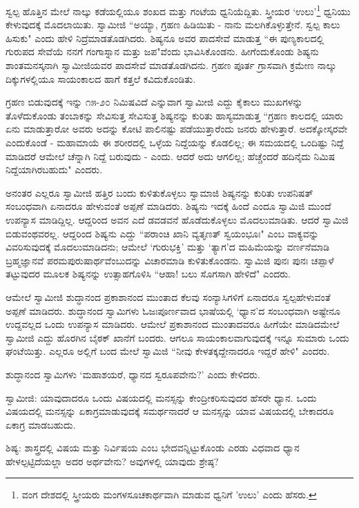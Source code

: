 ಸ್ವಲ್ಪ ಹೊತ್ತಿನ ಮೇಲೆ ನಾಲ್ಕು ಕಡೆಯಲ್ಲಿಯೂ ಶಂಖದ ಮತ್ತು ಗಂಟೆಯ ಧ್ವನಿಯೆದ್ದಿತು. ಸ್ತ್ರೀಯರ ‘ಉಲು’\footnote{ವಂಗ ದೇಶದಲ್ಲಿ ಸ್ತ್ರೀಯರು ಮಂಗಳಸೂಚಕಾರ್ಥವಾಗಿ ಮಾಡುವ ಧ್ವನಿಗೆ 'ಉಲು' ಎಂದು ಹೆಸರು.} ಧ್ವನಿಯು ಕೇಳುವುದಕ್ಕೆ ಮೊದಲಾಯಿತು. ಸ್ವಾಮೀಜಿ “ಅಯ್ಯಾ, ಗ್ರಹಣ ಹಿಡಿಯಿತು - ನಾನು ಮಲಗಿಕೊಳ್ಳುತ್ತೇನೆ. ಸ್ವಲ್ಪ ಕಾಲು ಹಿಸುಕು" ಎಂದು ಹೇಳಿ ನಿದ್ರೆಮಾಡತೊಡಗಿದರು. ಶಿಷ್ಯನೂ ಅವರ ಪಾದಸೇವೆ ಮಾಡುತ್ತ “ಈ ಪುಣ್ಯಕಾಲದಲ್ಲಿ ಗುರುಪದ ಸೇವೆಯೆ ನನಗೆ ಗಂಗಾಸ್ನಾನ ಮತ್ತು ಜಪ"ವೆಂದು ಭಾವಿಸಿಕೊಂಡನು. ಹೀಗೆಂದುಕೊಂಡು ಶಿಷ್ಯನು ಶಾಂತಮನಸ್ಕನಾಗಿ ಸ್ವಾಮೀಜಿಯವರ ಪಾದಸೇವೆ ಮಾಡತೊಡಗಿದನು. ಗ್ರಹಣ ಪೂರ್ತ ಗ್ರಾಸವಾಗಿ ಕ್ರಮೇಣ ನಾಲ್ಕು ದಿಕ್ಕುಗಳಲ್ಲಿಯೂ ಸಾಯಂಕಾಲದ ಹಾಗೆ ಕತ್ತಲೆ ಕವಿದುಕೊಂಡಿತು.

ಗ್ರಹಣ ಬಿಡುವುದಕ್ಕೆ ಇನ್ನು ೧೫-೨೦ ನಿಮಿಷವಿದೆ ಎನ್ನುವಾಗ ಸ್ವಾಮೀಜಿ ಎದ್ದು ಕೈಕಾಲು ಮುಖಗಳನ್ನು ತೊಳೆದುಕೊಂಡು ತಂಬಾಕನ್ನು ಸೇವಿಸುತ್ತ ಸೇವಿಸುತ್ತ ಶಿಷ್ಯನನ್ನು ಕುರಿತು ಹಾಸ್ಯಮಾಡುತ್ತ “ಗ್ರಹಣ ಕಾಲದಲ್ಲಿ ಯಾರು ಏನು ಮಾಡುತ್ತಾರೋ ಅವರು ಅದನ್ನು ಕೋಟಿ ಪಾಲಿನಷ್ಟು ಪಡೆಯುತ್ತಾರೆಂದು ಜನರು ಹೇಳುತ್ತಾರೆ. ಅದಕ್ಕೋಸ್ಕರವೇ ಎಂದುಕೊಂಡೆ - ಮಹಾಮಾಯೆ ಈ ಶರೀರದಲ್ಲಿ ಒಳ್ಳೆಯ ನಿದ್ದೆಯನ್ನು ಕೊಡಲಿಲ್ಲ; ಈ ಸಮಯದಲ್ಲಿ ಒಂದಿಷ್ಟು ನಿದ್ದೆ ಮಾಡಿದರೆ ಆಮೇಲೆ ಚೆನ್ನಾಗಿ ನಿದ್ದೆ ಬರುವುದು - ಎಂದು. ಆದರೆ ಅದು ಆಗಲಿಲ್ಲ; ಹೆಚ್ಚೆಂದರೆ ಹದಿನೈದು ನಿಮಿಷ ನಿದ್ದೆಯಾಗಿರಬಹುದು" ಎಂದರು.

ಅನಂತರ ಎಲ್ಲರೂ ಸ್ವಾಮೀಜಿ ಹತ್ತಿರ ಬಂದು ಕುಳಿತುಕೊಳ್ಳಲು ಸ್ವಾಮಾಜಿ ಶಿಷ್ಯನನ್ನು ಕುರಿತು ಉಪನಿಷತ್‌ ಸಂಬಂಧವಾಗಿ ಏನಾದರೂ ಹೇಳುವಂತೆ ಅಪ್ಪಣೆ ಮಾಡಿದರು. ಶಿಷ್ಯನು ಇದಕ್ಕೆ ಹಿಂದೆ ಎಂದೂ ಸ್ವಾಮಿಜಿ ಮುಂದೆ ಉಪನ್ಯಾಸ ಮಾಡಿದ್ದಿಲ್ಲ. ಆದ್ದರಿಂದ ಅವನ ಎದೆ ಡವಡವನೆ ಹೊಡೆದುಕೊಳ್ಳಲು ಮೊದಲುಮಾಡಿತು. ಆದರೆ ಸ್ವಾಮಿಜಿ ಬಿಡುವಂಥವರಲ್ಲ. ಆದ್ದರಿಂದ ಶಿಷ್ಯನು ಎದ್ದು “ಪರಾಂಚಿ ಖಾನಿ ವ್ಯತೃಣತ್ ಸ್ವಯಂಭೂಃ" ಎಂಬ ವಾಕ್ಯವನ್ನು ವಿವರಿಸುವುದಕ್ಕೆ ಮೊದಲುಮಾಡಿದನು; ಆಮೇಲೆ ‘ಗುರುಭಕ್ತಿ’ ಮತ್ತು ‘ತ್ಯಾಗ’ದ ಮಹಿಮೆಯನ್ನು ವರ್ಣನೆಮಾಡಿ ಬ್ರಹ್ಮಜ್ಞಾನವೆ ಪರಮಪುರುಷಾರ್ಥವೆಂಬುದನ್ನು ವಿಚಾರಮಾಡಿ ಕುಳಿತುಕೊಂಡನು. ಸ್ವಾಮಿಜಿ ಪುನಃ ಪುನಃ ಚಪ್ಪಾಳೆ ತಟ್ಟುವುದರ ಮೂಲಕ ಶಿಷ್ಯನನ್ನು ಉತ್ಸಾಹಗೊಳಿಸಿ “ಆಹಾ! ಬಲು ಸೊಗಸಾಗಿ ಹೇಳಿದೆ" ಎಂದರು.

ಆಮೇಲೆ ಸ್ವಾಮೀಜಿ ಶುದ್ಧಾನಂದ ಪ್ರಕಾಶಾನಂದ ಮುಂತಾದ ಕೆಲವು ಸಂನ್ಯಾಸಿಗಳಿಗೆ ಏನಾದರೂ ಸ್ವಲ್ಪಹೇಳುವಂತೆ ಅಪ್ಪಣೆ ಮಾಡಿದರು. ಶುದ್ಧಾನಂದ ಸ್ವಾಮಿಗಳು ಓಜಃಪೂರ್ಣವಾದ ಭಾಷೆಯಲ್ಲಿ ‘ಧ್ಯಾನ’ದ ಸಂಬಂಧವಾಗಿ ಅಷ್ಟೇನೂ ಉದ್ದವಲ್ಲದ ಒಂದು ಉಪನ್ಯಾಸ ಮಾಡಿದರು. ಆಮೇಲೆ ಪ್ರಕಾಶಾನಂದ ಮುಂತಾದವರೂ ಹೀಗೆಯೇ ಮಾಡಿದಮೇಲೆ ಸ್ವಾಮೀಜಿ ಎದ್ದು ಹೊರಗಿನ ಬೈಠಕ್ ಖಾನೆಗೆ ಬಂದರು. ಆಗಲೂ ಸಾಯಂಕಾಲವಾಗುವುದಕ್ಕೆ ಇನ್ನೂ ಸುಮಾರು ಒಂದು ಘಂಟೆಯಿತ್ತು. ಎಲ್ಲರೂ ಅಲ್ಲಿಗೆ ಬಂದ ಮೇಲೆ ಸ್ವಾಮಿಜಿ “ನೀವು ಕೇಳತಕ್ಕದ್ದೇನಾದರೂ ಇದ್ದರೆ ಹೇಳಿ" ಎಂದರು.

ಶುದ್ಧಾನಂದ ಸ್ವಾಮಿಗಳು ‘ಮಹಾಶಯರೆ, ಧ್ಯಾನದ ಸ್ವರೂಪವೇನು?’ ಎಂದು ಕೇಳಿದರು.

ಸ್ವಾಮೀಜಿ: ಯಾವುದಾದರೂ ಒಂದು ವಿಷಯದಲ್ಲಿ ಮನಸ್ಸನ್ನು ಕೇಂದ್ರೀಕರಿಸುವುದರ ಹೆಸರೇ ಧ್ಯಾನ. ಒಂದು ವಿಷಯದಲ್ಲಿ ಮನಸ್ಸನ್ನು ಏಕಾಗ್ರಮಾಡುವುದಕ್ಕೆ ಸಮರ್ಥನಾದರೆ ಆ ಮನಸ್ಸನ್ನು ಯಾವ ವಿಷಯದಲ್ಲಿ ಬೇಕಾದರೂ ಏಕಾಗ್ರ ಮಾಡಬಹುದು.

ಶಿಷ್ಯ: ಶಾಸ್ತ್ರದಲ್ಲಿ ವಿಷಯ ಮತ್ತು ನಿರ್ವಿಷಯ ಎಂಬ ಭೇದವನ್ನಿಟ್ಟುಕೊಂಡು ಎರಡು ವಿಧವಾದ ಧ್ಯಾನ ಹೇಳಲ್ಪಟ್ಟಿದೆಯಲ್ಲಾ ಅದರ ಅರ್ಥವೇನು? ಅವುಗಳಲ್ಲಿ ಯಾವುದು ಶ್ರೇಷ್ಠ?

